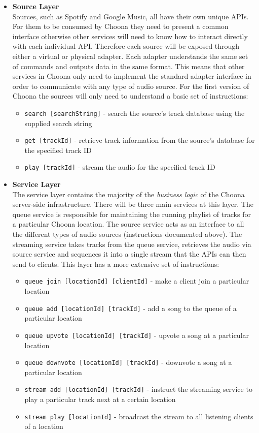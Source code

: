 \begin{itemize}
  \item \textbf{Source Layer}\\
    Sources, such as Spotify and Google Music, all have their own unique APIs. For them to be consumed by Choona they need to present a common interface otherwise other services will need to know how to interact directly with each individual API. Therefore each source will be exposed through either a virtual or physical adapter. Each adapter understands the same set of commands and outputs data in the same format. This means that other services in Choona only need to implement the standard adapter interface in order to communicate with any type of audio source. For the first version of Choona the sources will only need to understand a basic set of instructions:
    \begin{itemize}
      \item \texttt{search [searchString]} - search the source's track database using the supplied search string
      \item \texttt{get [trackId]} - retrieve track information from the source's database for the specified track ID
      \item \texttt{play [trackId]} - stream the audio for the specified track ID
    \end{itemize}

  \item \textbf{Service Layer}\\
    The service layer contains the majority of the \textit{business logic} of the Choona server-side infrastructure. There will be three main services at this layer. The queue service is responsible for maintaining the running playlist of tracks for a particular Choona location. The source service acts as an interface to all the different types of audio sources (instructions documented above). The streaming service takes tracks from the queue service, retrieves the audio via source service and sequences it into a single stream that the APIs can then send to clients. This layer has a more extensive set of instructions:
    \begin{itemize}
      \item \texttt{queue join [locationId] [clientId]} - make a client join a particular location
      \item \texttt{queue add [locationId] [trackId]} - add a song to the queue of a particular location
      \item \texttt{queue upvote [locationId] [trackId]} - upvote a song at a particular location
      \item \texttt{queue downvote [locationId] [trackId]} - downvote a song at a particular location
      \item \texttt{stream add [locationId] [trackId]} - instruct the streaming service to play a particular track next at a certain location
      \item \texttt{stream play [locationId]} - broadcast the stream to all listening clients of a location
    \end{itemize}


\end{itemize}
